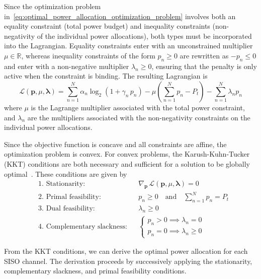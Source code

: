 Since the optimization problem in~\eqref{eq:optimal_power_allocation_optimization_problem} involves both an equality constraint (total power budget) and inequality constraints (non-negativity of the individual power allocations), both types must be incorporated into the Lagrangian.
Equality constraints enter with an unconstrained multiplier $\mu \in \mathbb{R}$, whereas inequality constraints of the form $p_n \geq 0$ are rewritten as $-p_n \leq 0$ and enter with a non-negative multiplier $\lambda_n \geq 0$, ensuring that the penalty is only active when the constraint is binding.
The resulting Lagrangian is
\begin{equation}
    \mathcal{L}(\mathbf{p}, \mu, \boldsymbol{\lambda}) = \sum_{n=1}^{N} \alpha_n \log_2 \left( 1 + \gamma_n \, p_n \right) - \mu \left(\sum_{n=1}^{N} p_n - P_t \right) - \sum_{n=1}^{N} \lambda_n p_n
\end{equation}
where $\mu$ is the Lagrange multiplier associated with the total power constraint, and $\lambda_n$ are the multipliers associated with the non-negativity constraints on the individual power allocations.

Since the objective function is concave and all constraints are affine, the optimization problem is convex.
For convex problems, the Karush-Kuhn-Tucker (KKT) conditions are both necessary and sufficient for a solution to be globally optimal~\cite{convex_optimization_2004, KKT_conditions_2009}.
These conditions are given by
\begin{subequations}
\label{eq:KKT_conditions}
\begin{align*}
    & \text{1. Stationarity:}               && \nabla_{\mathbf{p}} \, \mathcal{L}(\mathbf{p}, \mu, \boldsymbol{\lambda}) = 0 \\
    & \text{2. Primal feasibility:}         && p_n \geq 0  \quad \text{and} \quad \sum_{n=1}^{N} p_n = P_t \\
    & \text{3. Dual feasibility:}           && \lambda_n \geq 0 \\
    & \text{4. Complementary slackness:}    && \begin{cases} p_n > 0 \implies \lambda_n = 0 \\ p_n = 0 \implies \lambda_n \geq 0 \end{cases}
\end{align*}
\end{subequations}

From the KKT conditions, we can derive the optimal power allocation for each \ac{SISO} channel. The derivation proceeds by successively applying the stationarity, complementary slackness, and primal feasibility conditions.

